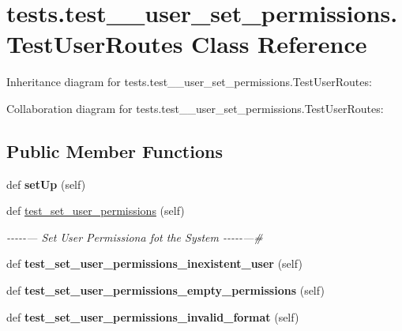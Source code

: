 \hypertarget{classtests_1_1test__10__user__set__permissions_1_1_test_user_routes}{}\section{tests.\+test\+\_\+\_\+user\+\_\+set\+\_\+permissions.\+Test\+User\+Routes Class Reference}
\label{classtests_1_1test__10__user__set__permissions_1_1_test_user_routes}


Inheritance diagram for tests.\+test\+\_\+\_\+user\+\_\+set\+\_\+permissions.\+Test\+User\+Routes\+:


Collaboration diagram for tests.\+test\+\_\+\_\+user\+\_\+set\+\_\+permissions.\+Test\+User\+Routes\+:
\subsection*{Public Member Functions}
\begin{DoxyCompactItemize}
\item 
\mbox{\label{classtests_1_1test__10__user__set__permissions_1_1_test_user_routes_a5773b06b2efffe868df74479c392e383}} 
def {\bfseries set\+Up} (self)
\item 
\mbox{\label{classtests_1_1test__10__user__set__permissions_1_1_test_user_routes_aa7374ec2b281be86b8813d849bca2ee1}} 
def \hyperlink{classtests_1_1test__10__user__set__permissions_1_1_test_user_routes_aa7374ec2b281be86b8813d849bca2ee1}{test\+\_\+set\+\_\+user\+\_\+permissions} (self)
\begin{DoxyCompactList}\small\item\em -\/-\/-\/-\/-\/--- Set User Permissiona fot the System -\/-\/-\/-\/-\/---\# \end{DoxyCompactList}\item 
\mbox{\label{classtests_1_1test__10__user__set__permissions_1_1_test_user_routes_a63b564027181682571313331b1f0f42b}} 
def {\bfseries test\+\_\+set\+\_\+user\+\_\+permissions\+\_\+inexistent\+\_\+user} (self)
\item 
\mbox{\label{classtests_1_1test__10__user__set__permissions_1_1_test_user_routes_a01d7331e15df9f31f5678d4cd3b88ebf}} 
def {\bfseries test\+\_\+set\+\_\+user\+\_\+permissions\+\_\+empty\+\_\+permissions} (self)
\item 
\mbox{\label{classtests_1_1test__10__user__set__permissions_1_1_test_user_routes_a9fccb7d908130092c5892f7faa71ce82}} 
def {\bfseries test\+\_\+set\+\_\+user\+\_\+permissions\+\_\+invalid\+\_\+format} (self)
\end{DoxyCompactItemize}
